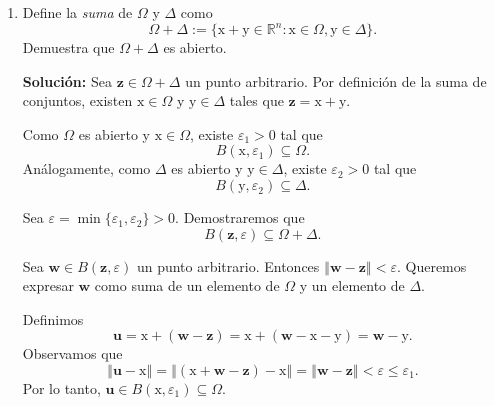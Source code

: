 \documentclass[12pt]{article}
\newcommand{\norm}[1]{\left\Vert#1\right\Vert}
\newcommand{\Ext}{\mathrm{ext}}
\newcommand{\R}{\mathbb R}
\newcommand{\x}{\mathrm x}
\newcommand{\y}{\mathrm y}
\begin{document}
\begin{enumerate}
\begin{enumerate}[(1)]
\textit{Observación:} En realidad, la contención correcta es $\Ext(\Delta) \subseteq \Ext(\Omega)$. Esto se debe a que si $\Omega \subseteq \Delta$, entonces $\R^n \setminus \Delta \subseteq \R^n \setminus \Omega$, y tomando interiores se obtiene $\Ext(\Delta) \subseteq \Ext(\Omega)$.

\textbf{Tercera propiedad:} $\partial \Omega\subset \partial \Delta$.

Esta propiedad es \textbf{falsa} en general.

\textit{Contraejemplo:} Tomemos $\Omega = [0,1]$ y $\Delta = [0,2]$ en $\R$. Claramente, $\Omega \subset \Delta$. Calculamos las fronteras:
\[
\partial \Omega = \partial([0,1]) = \{0, 1\},
\]
\[
\partial \Delta = \partial([0,2]) = \{0, 2\}.
\]
Observamos que $1 \in \partial \Omega$, pero $1 \notin \partial \Delta$. Por lo tanto, $\partial \Omega \not\subseteq \partial \Delta$, y la propiedad es falsa.
\end{enumerate}

\item Define la \emph{suma} de $\Omega$ y $\Delta$ como
\[ \Omega + \Delta := \{ \x+\y\in \R^n : \x\in \Omega, \y\in \Delta \}. \]
Demuestra que $\Omega + \Delta$ es abierto.

\textbf{Solución: } 
Sea $\mathbf{z} \in \Omega + \Delta$ un punto arbitrario. Por definición de la suma de conjuntos, existen $\x \in \Omega$ y $\y \in \Delta$ tales que $\mathbf{z} = \x + \y$.

Como $\Omega$ es abierto y $\x \in \Omega$, existe $\varepsilon_1 > 0$ tal que
\[
B(\x, \varepsilon_1) \subseteq \Omega.
\]
Análogamente, como $\Delta$ es abierto y $\y \in \Delta$, existe $\varepsilon_2 > 0$ tal que
\[
B(\y, \varepsilon_2) \subseteq \Delta.
\]

Sea $\varepsilon = \min\{\varepsilon_1, \varepsilon_2\} > 0$. Demostraremos que
\[
B(\mathbf{z}, \varepsilon) \subseteq \Omega + \Delta.
\]

Sea $\mathbf{w} \in B(\mathbf{z}, \varepsilon)$ un punto arbitrario. Entonces $\norm{\mathbf{w} - \mathbf{z}} < \varepsilon$. Queremos expresar $\mathbf{w}$ como suma de un elemento de $\Omega$ y un elemento de $\Delta$.

Definimos
\[
\mathbf{u} = \x + (\mathbf{w} - \mathbf{z}) = \x + (\mathbf{w} - \x - \y) = \mathbf{w} - \y.
\]
Observamos que
\[
\norm{\mathbf{u} - \x} = \norm{(\x + \mathbf{w} - \mathbf{z}) - \x} = \norm{\mathbf{w} - \mathbf{z}} < \varepsilon \leq \varepsilon_1.
\]
Por lo tanto, $\mathbf{u} \in B(\x, \varepsilon_1) \subseteq \Omega$.


\end{enumerate}
\end{document}
